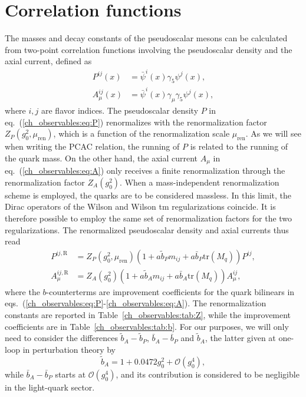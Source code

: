 \section{Correlation functions}
\label{ch_observables:sec:correlators}

The masses and decay constants of the pseudoscalar mesons can be calculated from two-point correlation functions involving the pseudoscalar density and the axial current, defined as 
\begin{align}
\label{ch_observables:eq:P}
P^{ij}(x)&=\bar{\psi}^{i}(x)\gamma_5\psi^{j}(x),\\
\label{ch_observables:eq:A}
A_{\mu}^{ij}(x)&=\bar{\psi}^i(x)\gamma_{\mu}\gamma_5\psi^{j}(x),
\end{align}
where $i,j$ are flavor indices. The pseudoscalar density $P$ in eq.~(\ref{ch_observables:eq:P}) renormalizes with the renormalization factor $Z_P(g_0^2,\mu_{\textrm{ren}})$, which is a function of the renormalization scale $\mu_{\textrm{ren}}$. As we will see when writing the PCAC relation, the running of $P$ is related to the running of the quark mass.  On the other hand, the axial current $A_{\mu}$ in eq.~(\ref{ch_observables:eq:A}) only receives a finite renormalization through the renormalization factor $Z_A(g_0^2)$. When  a mass-independent renormalization scheme is employed, the quarks are to be considered massless. In this limit, the Dirac operators of the Wilson and  Wilson tm regularizations coincide. It is therefore possible to employ the same set of renormalization factors for the two regularizations. The renormalized pseudoscalar density and axial currents thus read
\begin{align}
\label{ch_observables:eq:corr_ren}
P^{ij,{\textrm{R}}}&=Z_P(g_0^2,\mu_{\textrm{ren}})\left(1+a\tilde{b}_Pm_{ij}+a\bar{b}_P{\textrm{tr}}\left(M_q\right)\right)P^{ij}, \\
A_{\mu}^{ij,{\textrm{R}}}&=Z_A(g_0^2)\left(1+a\tilde{b}_Am_{ij}+a\bar{b}_A{\textrm{tr}}\left(M_q\right)\right)A_{\mu}^{ij},
\end{align}
where the $b$-counterterms are improvement coefficients for the quark bilinears in eqs.~(\ref{ch_observables:eq:P}-\ref{ch_observables:eq:A}). The renormalization constants are reported in Table~\ref{ch_observables:tab:Z}, while the improvement coefficients are in Table~\ref{ch_observables:tab:b}. For our purposes, we will only need to consider the differences $\tilde{b}_A-\tilde{b}_P$, $\bar{b}_A-\bar{b}_P$ and $\tilde{b}_A$, the latter given at one-loop in perturbation theory by~\citep{Taniguchi:1998pf}
\begin{equation}
\label{ch_observables:eq:bA}
\tilde{b}_A=1+0.0472g_0^2+\mathcal{O}(g_0^4),
\end{equation}
while $\bar{b}_A-\bar{b}_P$ starts at $\mathcal{O}(g_0^4)$, and its contribution is considered to be negligible in the light-quark sector.

